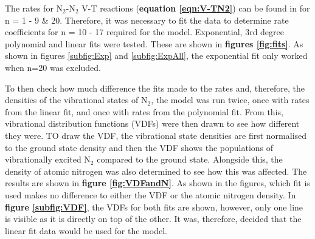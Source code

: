 \documentclass[11pt, oneside]{article}   	%
\begin{document}
The rates for N$_2$-N$_2$ V-T reactions (\textbf{equation \ref{eqn:V-TN2}}) can be found in  \cite{Billing1979vv} for n = 1 - 9 \& 20.
Therefore, it was necessary to fit the data to determine rate coefficients for n = 10 - 17 required for the model.
Exponential, 3rd degree polynomial and linear fits were tested.
These are shown in \textbf{figures \ref{fig:fits}}.
As shown in figures \ref{subfig:Exp} and \ref{subfig:ExpAll}, the exponential fit only worked when n=20 was excluded.

To then check how much difference the fits made to the rates and, therefore, the densities of the vibrational states of N$_2$, the model was run twice, once with rates from the linear fit, and once with rates from the polynomial fit.
From this, vibrational distribution functions (VDFs) were then drawn to see how different they were.
TO draw the VDF, the vibrational state densities are first normalised to the ground state density and then the VDF shows the populations of vibrationally excited N$_2$ compared to the ground state.
Alongside this, the density of atomic nitrogen was also determined to see how this was affected.
The results are shown in \textbf{figure \ref{fig:VDFandN}}.
As shown in the figures, which fit is used makes no difference to either the VDF or the atomic nitrogen density.
In \textbf{figure \ref{subfig:VDF}}, the VDFs for both fits are shown, however, only one line is visible as it is directly on top of the other.
It was, therefore, decided that the linear fit data would be used for the model.



\end{document}
